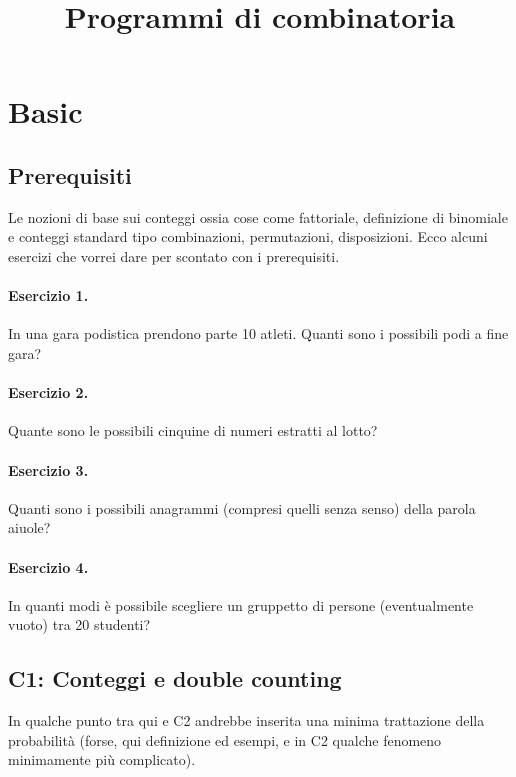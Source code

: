 \documentclass[a4paper,10pt]{article}
\title{Programmi di combinatoria}
\author{}
\begin{document}
\maketitle

\section{Basic}
\subsection{Prerequisiti}
Le nozioni di base sui conteggi ossia cose come fattoriale, definizione di binomiale e conteggi standard tipo combinazioni, permutazioni, disposizioni. Ecco alcuni esercizi che vorrei dare per scontato con i prerequisiti.
\paragraph{Esercizio 1.} In una gara podistica prendono parte 10 atleti. Quanti sono i possibili podi a fine gara?
\paragraph{Esercizio 2.} Quante sono le possibili cinquine di numeri estratti al lotto?
\paragraph{Esercizio 3.} Quanti sono i possibili anagrammi (compresi quelli senza senso) della parola aiuole?
\paragraph{Esercizio 4.} In quanti modi è possibile scegliere un gruppetto di persone
(eventualmente vuoto) tra 20 studenti?


\subsection{C1: Conteggi e double counting}
In qualche punto tra qui e C2 andrebbe inserita una minima trattazione della probabilità (forse, qui definizione ed esempi, e in C2 qualche fenomeno minimamente più complicato).
\end{document}
